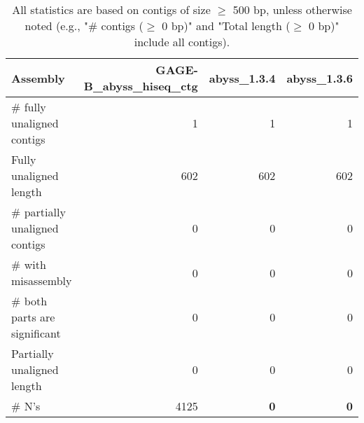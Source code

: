 \documentclass[12pt,a4paper]{article}
\begin{document}
\begin{table}[ht]
\begin{center}
\caption{All statistics are based on contigs of size $\geq$ 500 bp, unless otherwise noted (e.g., "\# contigs ($\geq$ 0 bp)" and "Total length ($\geq$ 0 bp)" include all contigs).}
\begin{tabular}{|l*{3}{|r}|}
\hline
Assembly & GAGE-B\_abyss\_hiseq\_ctg & abyss\_1.3.4 & abyss\_1.3.6 \\ \hline
\# fully unaligned contigs & 1 & 1 & 1 \\ \hline
Fully unaligned length & 602 & 602 & 602 \\ \hline
\# partially unaligned contigs & 0 & 0 & 0 \\ \hline
\hspace{5mm}\# with misassembly & 0 & 0 & 0 \\ \hline
\hspace{5mm}\# both parts are significant & 0 & 0 & 0 \\ \hline
Partially unaligned length & 0 & 0 & 0 \\ \hline
\# N's & 4125 & {\bf 0} & {\bf 0} \\ \hline
\end{tabular}
\end{center}
\end{table}
\end{document}
